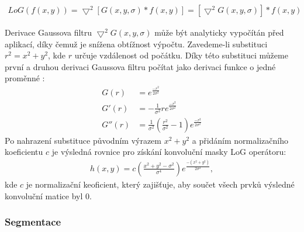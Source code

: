 \begin{align}
\label{eq:LoG1}
LoG \left (f \left (x,y \right ) \right )=
\bigtriangledown^2\left [ G(x,y,\sigma)\ast f(x,y) \right ] = 
\left [\bigtriangledown^2G(x,y,\sigma) \right ] \ast f(x,y)
\end{align}

Derivace Gaussova filtru $\bigtriangledown^2G(x,y,\sigma)$ může být analyticky vypočítán před aplikací, díky čemuž je snížena obtížnost výpočtu. Zavedeme-li substituci $r^2=x^2+y^2$, kde $r$ určuje vzdálenost od počátku. Díky této substituci můžeme první a druhou derivaci Gaussova filtru počítat jako derivaci funkce o jedné proměnné \cite[str.~140]{Image-Processing-Analysis-and-Machine-Vision}:
\begin{align}
\label{eq:LoG2}
G(r)    &=e^{\frac{-r^2}{2\sigma^2}} \\
G{}'(r) &= -\frac{1}{\sigma^2} r e^{\frac{-r^2}{2\sigma^2}} \\
G{}''(r)&= \frac{1}{\sigma^2} \left ( \frac{r^2}{\sigma^2} - 1 \right ) e^{\frac{-r^2}{2\sigma^2}} 
\end{align}
Po nahrazení substituce původním výrazem $x^2 + y^2$ a přidáním normalizačního koeficientu $c$ je výsledná rovnice pro získání konvoluční masky LoG operátoru:
\begin{align}
\label{eq:LoG2}
h\left ( x,y \right )=c \left ( \frac{x^2+y^2-\sigma^2}{\sigma^4} \right ) e^{\frac{-(x^2+y^2)}{2\sigma^2}}, 
\end{align}
kde $c$ je normalizační keoficient, který zajišťuje, aby součet všech prvků výsledné konvoluční matice byl 0. \cite[str.~140]{Image-Processing-Analysis-and-Machine-Vision}

\subsubsection{Segmentace}
